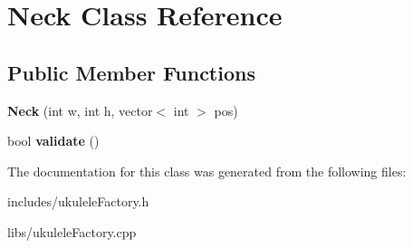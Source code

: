 \hypertarget{class_neck}{}\section{Neck Class Reference}
\label{class_neck}
\subsection*{Public Member Functions}
\begin{DoxyCompactItemize}
\item 
\hypertarget{class_neck_a5cc4c0c5f4fc6bf8c7416b3c5104767a}{}\label{class_neck_a5cc4c0c5f4fc6bf8c7416b3c5104767a} 
{\bfseries Neck} (int w, int h, vector$<$ int $>$ pos)
\item 
\hypertarget{class_neck_aec50f2ecbe39d970630412919428f929}{}\label{class_neck_aec50f2ecbe39d970630412919428f929} 
bool {\bfseries validate} ()
\end{DoxyCompactItemize}


The documentation for this class was generated from the following files\+:\begin{DoxyCompactItemize}
\item 
includes/ukulele\+Factory.\+h\item 
libs/ukulele\+Factory.\+cpp\end{DoxyCompactItemize}
